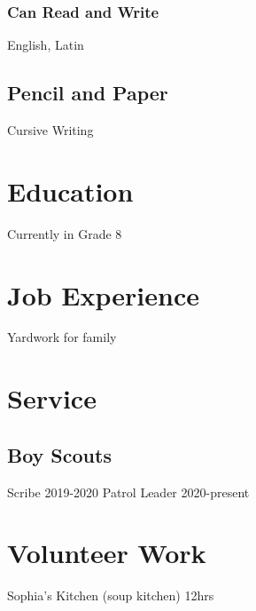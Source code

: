 \documentclass{article}
\begin{document}
\subsubsection{Can Read and Write}
English, Latin

\subsection{Pencil and Paper}
Cursive Writing

\section{Education}
Currently in Grade 8

\section{Job Experience}
Yardwork for family

\section{Service}
\subsection{Boy Scouts}
Scribe 2019-2020
Patrol Leader 2020-present

\section{Volunteer Work}
Sophia's Kitchen (soup kitchen) 12hrs
\end{document}
